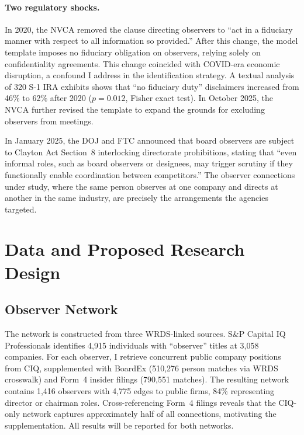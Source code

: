 \documentclass[12pt]{article}
\begin{document}
\paragraph{Two regulatory shocks.} In 2020, the NVCA removed the clause directing observers to ``act in a fiduciary manner with respect to all information so provided.'' After this change, the model template imposes no fiduciary obligation on observers, relying solely on confidentiality agreements. This change coincided with COVID-era economic disruption, a confound I address in the identification strategy. A textual analysis of 320 S-1 IRA exhibits shows that ``no fiduciary duty'' disclaimers increased from 46\% to 62\% after 2020 ($p=0.012$, Fisher exact test). In October 2025, the NVCA further revised the template to expand the grounds for excluding observers from meetings.

In January 2025, the DOJ and FTC announced that board observers are subject to Clayton Act Section~8 interlocking directorate prohibitions, stating that ``even informal roles, such as board observers or designees, may trigger scrutiny if they functionally enable coordination between competitors.'' The observer connections under study, where the same person observes at one company and directs at another in the same industry, are precisely the arrangements the agencies targeted.

\section{Data and Proposed Research Design}
\label{sec:data}

\subsection{Observer Network}

The network is constructed from three WRDS-linked sources. S\&P Capital IQ Professionals identifies 4,915 individuals with ``observer'' titles at 3,058 companies. For each observer, I retrieve concurrent public company positions from CIQ, supplemented with BoardEx (510,276 person matches via WRDS crosswalk) and Form~4 insider filings (790,551 matches). The resulting network contains 1,416 observers with 4,775 edges to public firms, 84\% representing director or chairman roles. Cross-referencing Form~4 filings reveals that the CIQ-only network captures approximately half of all connections, motivating the supplementation. All results will be reported for both networks.
\end{document}
